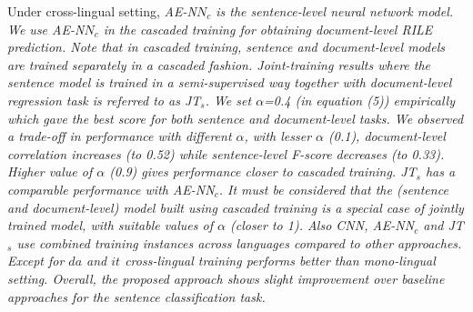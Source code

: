 \documentclass[11pt,a4paper]{article}
\begin{document}
Under cross-lingual setting, \em{AE-N$N_{c}$} \rm is the sentence-level neural network model. We use \em{AE-N$N_{c}$} \rm in the \textit{cascaded training} for obtaining document-level RILE prediction. Note that in \textit{cascaded training}, sentence and document-level models are trained separately in a cascaded fashion. Joint-training results where the sentence model is trained in a semi-supervised way together with document-level regression task is referred to as \em{JT$_{s}$}\rm. We set  $\alpha$=0.4 (in equation (5)) empirically which gave the best score for both sentence and document-level tasks. We observed a trade-off in performance with different $\alpha$, with lesser $\alpha$ (0.1), document-level correlation increases (to 0.52) while sentence-level F-score decreases (to 0.33). Higher value of $\alpha$ (0.9) gives performance closer to cascaded training. \em{JT$_{s}$} \rm has a comparable performance with \em{AE-NN$_{c}$}. \rm It must be considered that the (sentence and document-level) model built using cascaded training is a special case of jointly trained model, with suitable values of $\alpha$ (closer to 1). Also \em{CNN}, \em{AE-NN}$_{c}$ and \em{JT}$_{s}$ \rm use combined training instances across languages compared to other approaches. Except for $da$ and $it$ cross-lingual training performs better than mono-lingual setting. Overall, the proposed approach shows slight improvement over baseline approaches for the sentence classification task.
\end{document}
